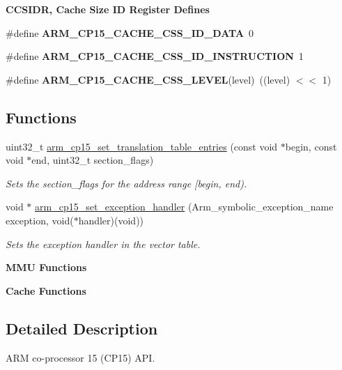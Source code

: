 \begin{Indent}\textbf{ C\+C\+S\+I\+DR, Cache Size ID Register Defines}\par
\begin{DoxyCompactItemize}
\item 
\#define {\bfseries A\+R\+M\+\_\+\+C\+P15\+\_\+\+C\+A\+C\+H\+E\+\_\+\+C\+S\+S\+\_\+\+I\+D\+\_\+\+D\+A\+TA}~0
\item 
\#define {\bfseries A\+R\+M\+\_\+\+C\+P15\+\_\+\+C\+A\+C\+H\+E\+\_\+\+C\+S\+S\+\_\+\+I\+D\+\_\+\+I\+N\+S\+T\+R\+U\+C\+T\+I\+ON}~1
\item 
\#define {\bfseries A\+R\+M\+\_\+\+C\+P15\+\_\+\+C\+A\+C\+H\+E\+\_\+\+C\+S\+S\+\_\+\+L\+E\+V\+EL}(level)~((level) $<$$<$ 1)
\end{DoxyCompactItemize}
\end{Indent}
\subsection*{Functions}
\begin{DoxyCompactItemize}
\item 
uint32\+\_\+t \mbox{\hyperlink{group__RTEMSScoreCPUARMCP15_gab76cb317225e4db5d2db0d8e6b578989}{arm\+\_\+cp15\+\_\+set\+\_\+translation\+\_\+table\+\_\+entries}} (const void $\ast$begin, const void $\ast$end, uint32\+\_\+t section\+\_\+flags)
\begin{DoxyCompactList}\small\item\em Sets the {\itshape section\+\_\+flags} for the address range \mbox{[}{\itshape begin}, {\itshape end}). \end{DoxyCompactList}\item 
void $\ast$ \mbox{\hyperlink{group__RTEMSScoreCPUARMCP15_gacda151e27e8a36daac7101d37ad26f69}{arm\+\_\+cp15\+\_\+set\+\_\+exception\+\_\+handler}} (Arm\+\_\+symbolic\+\_\+exception\+\_\+name exception, void($\ast$handler)(void))
\begin{DoxyCompactList}\small\item\em Sets the {\itshape exception} {\itshape handler} in the vector table. \end{DoxyCompactList}\end{DoxyCompactItemize}
\begin{Indent}\textbf{ M\+MU Functions}\par
\end{Indent}
\begin{Indent}\textbf{ Cache Functions}\par
\end{Indent}


\subsection{Detailed Description}
A\+RM co-\/processor 15 (C\+P15) A\+PI. 

